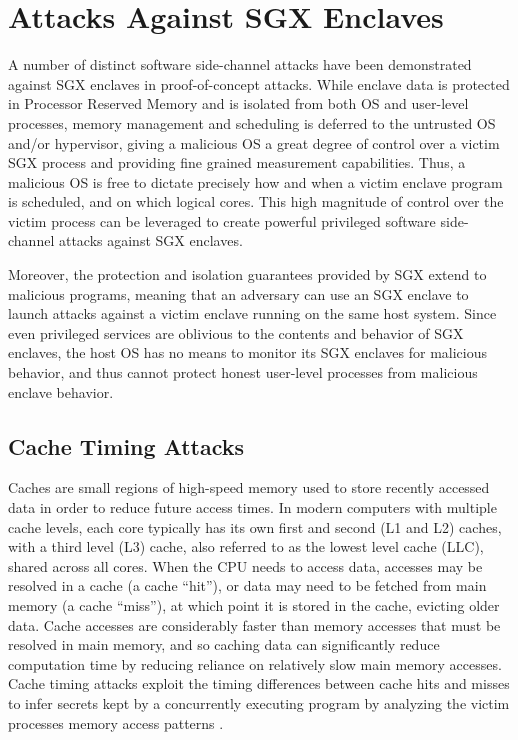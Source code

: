 \section{Attacks Against SGX Enclaves}

A number of distinct software side-channel attacks have been demonstrated against SGX enclaves in proof-of-concept attacks. While enclave data is protected in Processor Reserved Memory and is isolated from both OS and user-level processes, memory management and scheduling is deferred to the untrusted OS and/or hypervisor, giving a malicious OS a great degree of control over a victim SGX process and providing fine grained measurement capabilities. Thus, a malicious OS is free to dictate precisely how and when a victim enclave program is scheduled, and on which logical cores. This high magnitude of control over the victim process can be leveraged to create powerful privileged software side-channel attacks against SGX enclaves. 

Moreover, the protection and isolation guarantees provided by SGX extend to malicious programs, meaning that an adversary can use an SGX enclave to launch attacks against a victim enclave running on the same host system. Since even privileged services are oblivious to the contents and behavior of SGX enclaves, the host OS has no means to monitor its SGX enclaves for malicious behavior, and thus cannot protect honest user-level processes from malicious enclave behavior.

\subsection{Cache Timing Attacks}

Caches are small regions of high-speed memory used to store recently accessed data in order to reduce future access times. In modern computers with multiple cache levels, each core typically has its own first and second (L1 and L2) caches, with a third level (L3) cache, also referred to as the lowest level cache (LLC), shared across all cores. When the CPU needs to access data, accesses may be resolved in a cache (a cache ``hit''), or data may need to be fetched from main memory (a cache ``miss''), at which point it is stored in the cache, evicting older data. Cache accesses are considerably faster than memory accesses that must be resolved in main memory, and so caching data can significantly reduce computation time by reducing reliance on relatively slow main memory accesses. Cache timing attacks exploit the timing differences between cache hits and misses to infer secrets kept by a concurrently executing program by analyzing the victim processes memory access patterns \cite{costan_intel_2016, moghimi_cachezoom:_2017}.  


